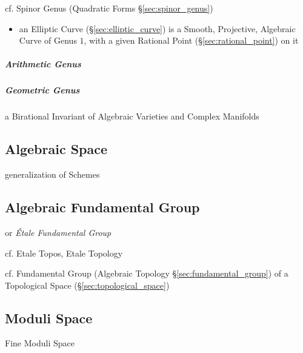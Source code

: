 \fist cf. Spinor Genus (Quadratic Forms \S\ref{sec:spinor_genus})

\begin{itemize}
  \item an Elliptic Curve (\S\ref{sec:elliptic_curve}) is a Smooth, Projective,
    Algebraic Curve of Genus $1$, with a given Rational Point
    (\S\ref{sec:rational_point}) on it
\end{itemize}



\subparagraph{Arithmetic Genus}\label{sec:arithmetic_genus}\hfill

\subparagraph{Geometric Genus}\label{sec:geometric_genus}\hfill

a Birational Invariant of Algebraic Varieties and Complex Manifolds



\subsection{Algebraic Space}\label{sec:algebraic_space}

generalization of Schemes



\subsection{Algebraic Fundamental Group}\label{sec:algebraic_fundamental_group}

or \emph{\'Etale Fundamental Group}

cf. Etale Topos, Etale Topology

cf. Fundamental Group (Algebraic Topology \S\ref{sec:fundamental_group}) of a
Topological Space (\S\ref{sec:topological_space})



\subsection{Moduli Space}\label{sec:moduli_space}

Fine Moduli Space

